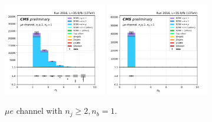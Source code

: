 \begin{figure}[ht]
    \includegraphics[width=0.4\textwidth]{chapters/Analysis/sectionPlots/figures/kinematics_pickles/emu/1b/emu_1b_nJets.pdf}
    \includegraphics[width=0.4\textwidth]{chapters/Analysis/sectionPlots/figures/kinematics_pickles/emu/1b/emu_1b_nBJets.pdf}
    
    \caption{$\mu e$ channel with $n_j\geq2, n_b=1$.}
\end{figure}

